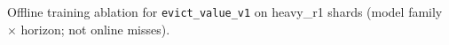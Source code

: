 \begin{table}[t]
\centering
\caption{Offline training ablation for \texttt{evict\_value\_v1} on heavy\_r1 shards (model family $\times$ horizon; not online misses).}
\label{tab:pre-eval-training-ablation}

\end{table}
